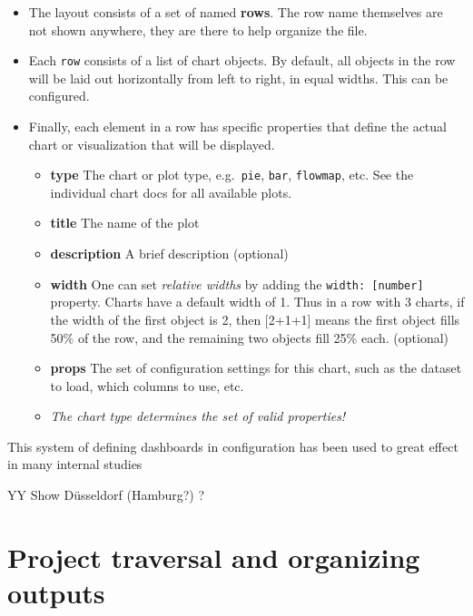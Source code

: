 \begin{itemize}
\item
  The layout consists of a set of named \textbf{rows}. The row name
  themselves are not shown anywhere, they are there to help organize the
  file.
\item
  Each \texttt{row} consists of a list of chart objects. By default, all
  objects in the row will be laid out horizontally from left to right,
  in equal widths. This can be configured.
\item
  Finally, each element in a row has specific properties that define the
  actual chart or visualization that will be displayed.

  \begin{itemize}
  \item
    \textbf{type} The chart or plot type, e.g.~\texttt{pie},
    \texttt{bar}, \texttt{flowmap}, etc. See the individual chart docs
    for all available plots.
  \item
    \textbf{title} The name of the plot
  \item
    \textbf{description} A brief description (optional)
  \item
    \textbf{width} One can set \emph{relative widths} by adding the
    \texttt{width:\ {[}number{]}} property. Charts have a default width
    of 1. Thus in a row with 3 charts, if the width of the first object
    is 2, then {[}2+1+1{]} means the first object fills 50\% of the row,
    and the remaining two objects fill 25\% each. (optional)
  \item
    \textbf{props} The set of configuration settings for this chart,
    such as the dataset to load, which columns to use, etc.
  \item
    \emph{The chart type determines the set of valid properties!}
  \end{itemize}
\end{itemize}

This system of defining dashboards in configuration has been used to
great effect in many internal studies

YY Show Düsseldorf (Hamburg?) ?


\hypertarget{project-traversal-and-organizing-outputs}{%
\section{Project traversal and organizing
outputs}\label{project-traversal-and-organizing-outputs}}

